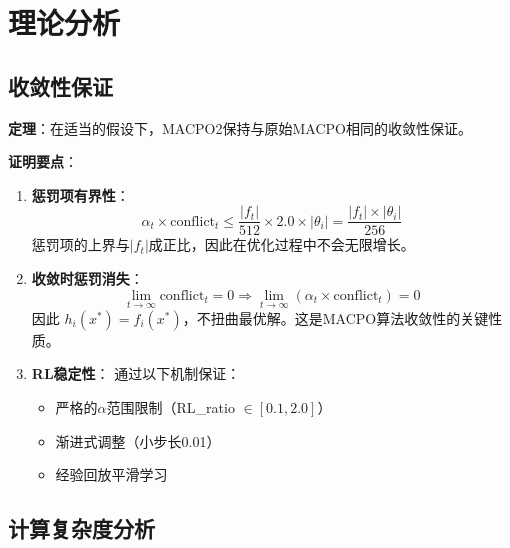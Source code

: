 \documentclass[15pt,a3paper]{ctexart}
\begin{document}
\section{理论分析}

\subsection{收敛性保证}

\textbf{定理}：在适当的假设下，MACPO2保持与原始MACPO相同的收敛性保证。

\textbf{证明要点}：
\begin{enumerate}
    \item \textbf{惩罚项有界性}：
    \begin{equation}
    \alpha_t \times \text{conflict}_t \leq \frac{|f_t|}{512} \times 2.0 \times |\theta_i| = \frac{|f_t| \times |\theta_i|}{256}
    \end{equation}
    惩罚项的上界与$|f_t|$成正比，因此在优化过程中不会无限增长。
    
    \item \textbf{收敛时惩罚消失}：
    \begin{equation}
    \lim_{t \to \infty} \text{conflict}_t = 0 \Rightarrow \lim_{t \to \infty} (\alpha_t \times \text{conflict}_t) = 0
    \end{equation}
    因此 $h_i(x^*) = f_i(x^*)$，不扭曲最优解。这是MACPO算法收敛性的关键性质。
    
    \item \textbf{RL稳定性}：
    通过以下机制保证：
    \begin{itemize}
        \item 严格的$\alpha$范围限制（RL\_ratio $\in [0.1, 2.0]$）
        \item 渐进式调整（小步长0.01）
        \item 经验回放平滑学习
    \end{itemize}
\end{enumerate}

\subsection{计算复杂度分析}
\end{document}
